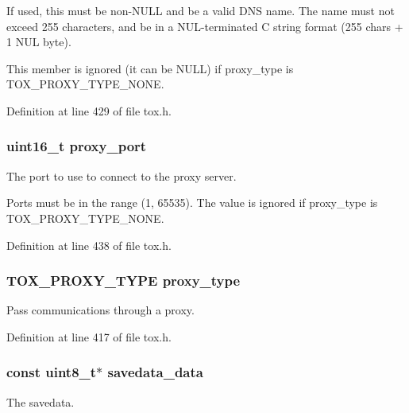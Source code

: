 If used, this must be non-\/\+N\+U\+L\+L and be a valid D\+N\+S name. The name must not exceed 255 characters, and be in a N\+U\+L-\/terminated C string format (255 chars + 1 N\+U\+L byte).

This member is ignored (it can be N\+U\+L\+L) if proxy\+\_\+type is T\+O\+X\+\_\+\+P\+R\+O\+X\+Y\+\_\+\+T\+Y\+P\+E\+\_\+\+N\+O\+N\+E. 

Definition at line 429 of file tox.\+h.

\hypertarget{struct_tox___options_a0693366412d32f9b8ceba1bf4f320132}{
\subsubsection[{proxy\+\_\+port}]{\setlength{\rightskip}{0pt plus 5cm}uint16\+\_\+t proxy\+\_\+port}}\label{struct_tox___options_a0693366412d32f9b8ceba1bf4f320132}
The port to use to connect to the proxy server.

Ports must be in the range (1, 65535). The value is ignored if proxy\+\_\+type is T\+O\+X\+\_\+\+P\+R\+O\+X\+Y\+\_\+\+T\+Y\+P\+E\+\_\+\+N\+O\+N\+E. 

Definition at line 438 of file tox.\+h.

\hypertarget{struct_tox___options_a32a512eb6e2c820735f1c51cd1075ce4}{
\subsubsection[{proxy\+\_\+type}]{\setlength{\rightskip}{0pt plus 5cm}T\+O\+X\+\_\+\+P\+R\+O\+X\+Y\+\_\+\+T\+Y\+P\+E proxy\+\_\+type}}\label{struct_tox___options_a32a512eb6e2c820735f1c51cd1075ce4}
Pass communications through a proxy. 

Definition at line 417 of file tox.\+h.

\hypertarget{struct_tox___options_af298081c5f07deace07b2ced2c0a9c3d}{
\subsubsection[{savedata\+\_\+data}]{\setlength{\rightskip}{0pt plus 5cm}const uint8\+\_\+t$\ast$ savedata\+\_\+data}}\label{struct_tox___options_af298081c5f07deace07b2ced2c0a9c3d}
The savedata. 

